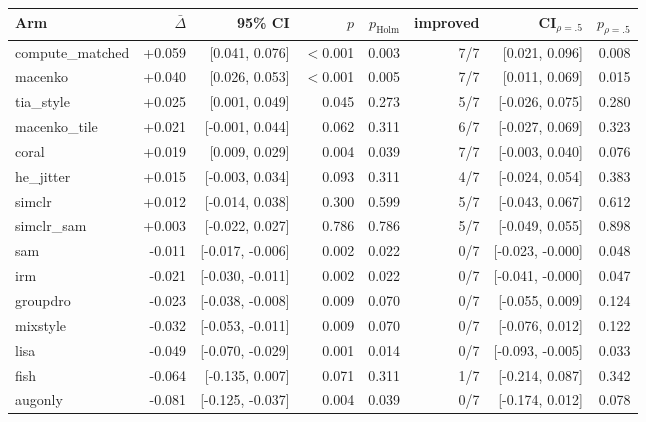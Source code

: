 \begin{tabular}{lrrrrrrr}
\toprule
Arm & $\bar\Delta$ & 95\% CI & $p$ & $p_\text{Holm}$ & improved & CI$_{\rho=.5}$ & $p_{\rho=.5}$ \\
\midrule
compute\_matched & +0.059 & [0.041, 0.076] & $<$0.001 & 0.003 & 7/7 & [0.021, 0.096] & 0.008 \\
macenko & +0.040 & [0.026, 0.053] & $<$0.001 & 0.005 & 7/7 & [0.011, 0.069] & 0.015 \\
tia\_style & +0.025 & [0.001, 0.049] & 0.045 & 0.273 & 5/7 & [-0.026, 0.075] & 0.280 \\
macenko\_tile & +0.021 & [-0.001, 0.044] & 0.062 & 0.311 & 6/7 & [-0.027, 0.069] & 0.323 \\
coral & +0.019 & [0.009, 0.029] & 0.004 & 0.039 & 7/7 & [-0.003, 0.040] & 0.076 \\
he\_jitter & +0.015 & [-0.003, 0.034] & 0.093 & 0.311 & 4/7 & [-0.024, 0.054] & 0.383 \\
simclr & +0.012 & [-0.014, 0.038] & 0.300 & 0.599 & 5/7 & [-0.043, 0.067] & 0.612 \\
simclr\_sam & +0.003 & [-0.022, 0.027] & 0.786 & 0.786 & 5/7 & [-0.049, 0.055] & 0.898 \\
sam & -0.011 & [-0.017, -0.006] & 0.002 & 0.022 & 0/7 & [-0.023, -0.000] & 0.048 \\
irm & -0.021 & [-0.030, -0.011] & 0.002 & 0.022 & 0/7 & [-0.041, -0.000] & 0.047 \\
groupdro & -0.023 & [-0.038, -0.008] & 0.009 & 0.070 & 0/7 & [-0.055, 0.009] & 0.124 \\
mixstyle & -0.032 & [-0.053, -0.011] & 0.009 & 0.070 & 0/7 & [-0.076, 0.012] & 0.122 \\
lisa & -0.049 & [-0.070, -0.029] & 0.001 & 0.014 & 0/7 & [-0.093, -0.005] & 0.033 \\
fish & -0.064 & [-0.135, 0.007] & 0.071 & 0.311 & 1/7 & [-0.214, 0.087] & 0.342 \\
augonly & -0.081 & [-0.125, -0.037] & 0.004 & 0.039 & 0/7 & [-0.174, 0.012] & 0.078 \\
\bottomrule
\end{tabular}
